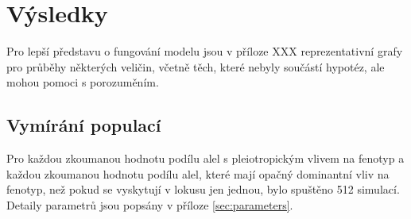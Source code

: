 \chapter{Výsledky}

%
%
%
%
%
%
%

Pro lepší představu o fungování modelu jsou v příloze XXX reprezentativní grafy pro průběhy některých veličin,
včetně těch, které nebyly součástí hypotéz, ale mohou pomoci s porozuměním.

\section{Vymírání populací}

Pro každou zkoumanou hodnotu podílu alel s pleiotropickým vlivem na
fenotyp a každou zkoumanou hodnotu podílu alel, které mají opačný dominantní vliv na fenotyp, než pokud se
vyskytují v lokusu jen jednou, bylo spuštěno 512 simulací. Detaily parametrů jsou popsány v příloze
\ref{sec:parameters}.

